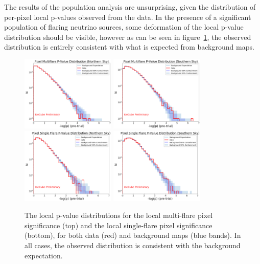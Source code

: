 The results of the population analysis are unsurprising, given the distribution of per-pixel local p-values observed from the data. In the presence of a significant population of flaring neutrino sources, some deformation of the local p-value distribution should be visible, however as can be seen in figure~\ref{fig:pdists}, the observed distribution is entirely consistent with what is expected from background maps. 

\begin{figure}[h]
\centering
\includegraphics[width=0.4\textwidth]{figs/pixel_pdist_north.png}
\includegraphics[width=0.4\textwidth]{figs/pixel_pdist_south.png}
\includegraphics[width=0.4\textwidth]{figs/pixel_sf_pdist_north.png}
\includegraphics[width=0.4\textwidth]{figs/pixel_sf_pdist_south.png}
\caption{The local p-value distributions for the local multi-flare pixel significance (top) and the local single-flare pixel significance (bottom), for both data (red) and background maps (blue bands). In all cases, the observed distribution is consistent with the background expectation.}
\label{fig:pdists}
\end{figure}

